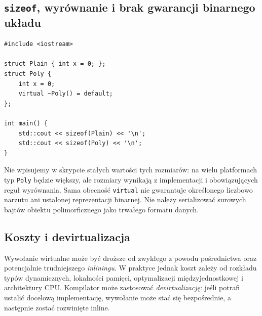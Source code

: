 \begin{center}
\end{center}

\subsection{\texttt{sizeof}, wyrównanie i brak gwarancji binarnego układu}

\begin{lstlisting}[caption={Empiryczny rozmiar klasy polimorficznej (C++11); kompletny program.}]
#include <iostream>

struct Plain { int x = 0; };
struct Poly {
    int x = 0;
    virtual ~Poly() = default;
};

int main() {
    std::cout << sizeof(Plain) << '\n';
    std::cout << sizeof(Poly) << '\n';
}
\end{lstlisting}

Nie wpisujemy w skrypcie stałych wartości tych rozmiarów:
na wielu platformach typ \texttt{Poly} będzie większy, ale
rozmiary wynikają z implementacji i obowiązujących reguł
wyrównania. Sama obecność \texttt{virtual} nie gwarantuje określonego
liczbowo narzutu ani ustalonej reprezentacji binarnej.
Nie należy serializować surowych bajtów obiektu polimorficznego
jako trwałego formatu danych.

\subsection{Koszty i devirtualizacja}

Wywołanie wirtualne może być droższe od zwykłego z powodu
pośrednictwa oraz potencjalnie trudniejszego \emph{inliningu}.
W praktyce jednak koszt zależy od rozkładu typów dynamicznych,
lokalności pamięci, optymalizacji międzyjednostkowej i architektury CPU.
Kompilator może zastosować \emph{devirtualizację}: jeśli potrafi
ustalić docelową implementację, wywołanie może stać się bezpośrednie,
a następnie zostać rozwinięte inline.

